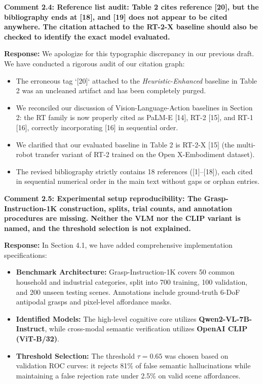 \documentclass[11pt]{article}
\newcommand{\reviewercomment}[1]{\vspace{1.8ex}\noindent\textbf{\textcolor{revcolor}{#1}}}
\newcommand{\response}{\vspace{1ex}\noindent\textbf{Response: }}
\begin{document}
\reviewercomment{Comment 2.4: Reference list audit: Table 2 cites reference [20], but the bibliography ends at [18], and [19] does not appear to be cited anywhere. The citation attached to the RT-2-X baseline should also be checked to identify the exact model evaluated.}

\response
We apologize for this typographic discrepancy in our previous draft. We have conducted a rigorous audit of our citation graph:
\begin{itemize}[leftmargin=*]
    \item The erroneous tag `[20]` attached to the \textit{Heuristic-Enhanced} baseline in Table 2 was an uncleaned artifact and has been completely purged.
    \item We reconciled our discussion of Vision-Language-Action baselines in Section 2: the RT family is now properly cited as PaLM-E [14], RT-2 [15], and RT-1 [16], correctly incorporating [16] in sequential order.
    \item We clarified that our evaluated baseline in Table 2 is RT-2-X [15] (the multi-robot transfer variant of RT-2 trained on the Open X-Embodiment dataset).
    \item The revised bibliography strictly contains 18 references ([1]--[18]), each cited in sequential numerical order in the main text without gaps or orphan entries.
\end{itemize}

\reviewercomment{Comment 2.5: Experimental setup reproducibility: The Grasp-Instruction-1K construction, splits, trial counts, and annotation procedures are missing. Neither the VLM nor the CLIP variant is named, and the threshold selection is not explained.}

\response
In Section 4.1, we have added comprehensive implementation specifications:
\begin{itemize}[leftmargin=*]
    \item \textbf{Benchmark Architecture:} Grasp-Instruction-1K covers 50 common household and industrial categories, split into 700 training, 100 validation, and 200 unseen testing scenes. Annotations include ground-truth 6-DoF antipodal grasps and pixel-level affordance masks.
    \item \textbf{Identified Models:} The high-level cognitive core utilizes \textbf{Qwen2-VL-7B-Instruct}, while cross-modal semantic verification utilizes \textbf{OpenAI CLIP (ViT-B/32)}.
    \item \textbf{Threshold Selection:} The threshold $\tau = 0.65$ was chosen based on validation ROC curves: it rejects 81\% of false semantic hallucinations while maintaining a false rejection rate under 2.5\% on valid scene affordances.
\end{itemize}
\end{document}
